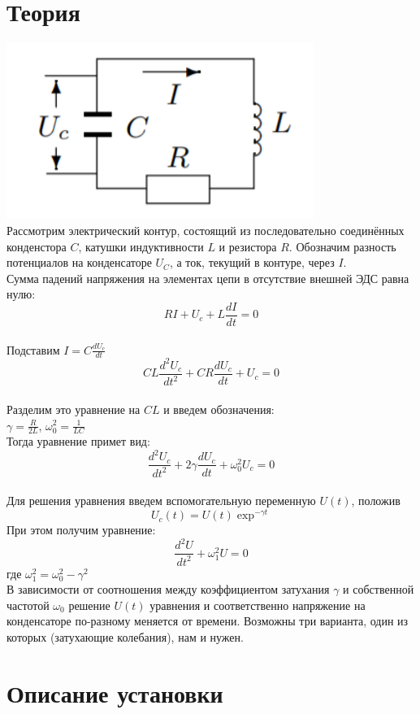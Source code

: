 \documentclass[11pt]{article}
\begin{document}
\section{Теория}
\includegraphics[width=10cm]{g1}\\
Рассмотрим электрический контур, состоящий из последовательно соединённых конденстора $C$, катушки индуктивности $L$ и резистора $R$. Обозначим разность потенциалов на конденсаторе $U_C$, а ток, текущий в контуре, через $I$. \\
Сумма падений напряжения на элементах цепи в отсутствие внешней ЭДС равна нулю:\\
$$RI + U_c + L\frac{dI}{dt} = 0$$\\
Подставим $I = C\frac{dU_c}{dt}$\\
$$CL\frac{d^2U_c}{dt^2} + CR\frac{dU_c}{dt} + U_c = 0$$\\
Разделим это уравнение на $CL$ и введем обозначения:\\
$\gamma = \frac{R}{2L}$, $\omega_{0}^2 = \frac{1}{LC}$\\
Тогда уравнение примет вид:\\
$$\frac{d^2U_c}{dt^2} + 2\gamma\frac{dU_c}{dt} + \omega_{0}^2U_{c} = 0$$\\
Для решения уравнения введем вспомогательную переменную $U(t)$, положив 
$$U_c(t) = U(t)\exp^{-\gamma t}$$
При этом получим уравнение:
$$\frac{d^2U}{dt^2} + \omega_{1}^2U = 0$$ где $\omega_{1}^2 = \omega_{0}^2 - \gamma^2$\\
В зависимости от соотношения между коэффициентом затухания $\gamma$ и собственной частотой $\omega_{0}$ решение $U(t)$ уравнения и соответственно напряжение на конденсаторе по-разному меняется от времени. Возможны три варианта, один из которых (затухающие колебания), нам и нужен. \\
\section{Описание установки}
\end{document}
